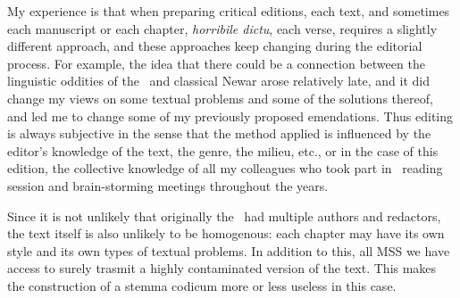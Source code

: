 \noindent
My experience is that when preparing critical editions, each text, 
and sometimes each manuscript or each chapter, \textit{horribile dictu},
each verse, requires a slightly different approach, and these approaches 
keep changing during the editorial process. For example, the idea that 
there could be a connection between the linguistic oddities of 
the \VSS\ and classical Newar
arose relatively late, and it did change my views on some textual
problems and some of the solutions thereof, and led me to change some
of my previously proposed emendations.
Thus editing is always subjective in the sense that the method
applied is influenced by the editor's knowledge of the text, the genre,
the milieu, etc., or in the case of this edition, the collective knowledge
of all my colleagues who took part in \VSS\ reading session and brain-storming
meetings throughout the years.

Since it is not unlikely that originally the \VSS\ had multiple authors and redactors,
the text itself is also unlikely to be homogenous: each chapter may
have its own style and its own types of textual problems. In addition 
to this, all MSS we have access to surely trasmit a highly contaminated
version of the text. This makes the construction of a stemma codicum more or less
useless in this case.
